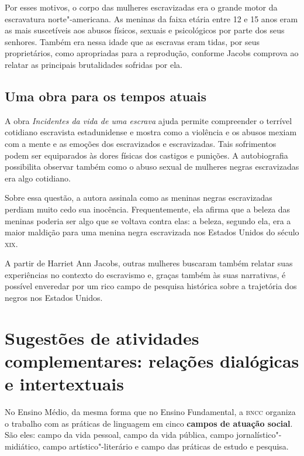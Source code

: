 \documentclass[12pt]{extarticle}
\begin{document}
Por esses motivos, o corpo das mulheres escravizadas era o grande motor
da escravatura norte"-americana. As meninas da faixa etária entre 12 e 15
anos eram as mais suscetíveis aos abusos físicos, sexuais e psicológicos
por parte dos seus senhores. Também era nessa idade que as escravas eram
tidas, por seus proprietários, como apropriadas para a reprodução,
conforme Jacobs comprova ao relatar as principais brutalidades sofridas
por ela.




\subsection{Uma obra para os tempos atuais}

A obra \emph{Incidentes da vida de uma escrava} ajuda permite
compreender o terrível cotidiano escravista estadunidense e mostra como
a violência e os abusos mexiam com a mente e as emoções dos escravizados
e escravizadas. Tais sofrimentos podem ser equiparados às dores físicas
dos castigos e punições. A autobiografia possibilita observar também
como o abuso sexual de mulheres negras escravizadas era algo cotidiano.

Sobre essa questão, a autora assinala como as meninas negras
escravizadas perdiam muito cedo sua inocência. Frequentemente, ela
afirma que a beleza das meninas poderia ser algo que se voltava contra
elas: a beleza, segundo ela, era a maior maldição para uma menina negra
escravizada nos Estados Unidos do século \textsc{xix}.

A partir de Harriet Ann Jacobs, outras mulheres buscaram também relatar
suas experiências no contexto do escravismo e, graças também às suas
narrativas, é possível enveredar por um rico campo de pesquisa histórica
sobre a trajetória dos negros nos Estados Unidos.

\section{Sugestões de atividades complementares: relações dialógicas e
intertextuais}


No Ensino Médio, da mesma forma que no Ensino Fundamental, a \textsc{bncc}
organiza o trabalho com as práticas de linguagem em cinco \textbf{campos
de atuação social}. São eles: campo da vida pessoal, campo da vida
pública, campo jornalístico"-midiático, campo artístico"-literário e campo
das práticas de estudo e pesquisa.
\end{document}
